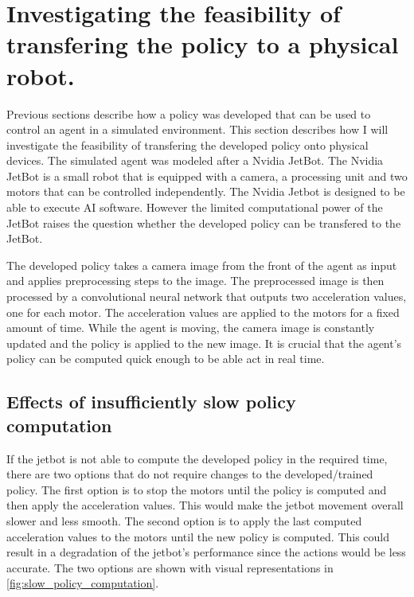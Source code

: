 
\section{Investigating the feasibility of transfering the policy to a physical robot.}

Previous sections describe how a policy was developed that can be used to control an agent in a simulated environment. This section describes how I will investigate the feasibility of transfering the developed policy onto physical devices. The simulated agent was modeled after a Nvidia JetBot. The Nvidia JetBot is a small robot that is equipped with a camera, a processing unit and two motors that can be controlled independently. 
The Nvidia Jetbot is designed to be able to execute AI software. However the limited computational power of the JetBot raises the question whether the developed policy can be transfered to the JetBot. 

The developed policy takes a camera image from the front of the agent as input and applies preprocessing steps to the image. The preprocessed image is then processed by a convolutional neural network that outputs two acceleration values, one for each motor. The acceleration values are applied to the motors for a fixed amount of time. While the agent is moving, the camera image is constantly updated and the policy is applied to the new image. It is crucial that the agent's policy can be computed quick enough to be able act in real time. 

\subsection*{Effects of insufficiently slow policy computation}
If the jetbot is not able to compute the developed policy in the required time, there are two options that do not require changes to the developed/trained policy. The first option is to stop the motors until the policy is computed and then apply the acceleration values. This would make the jetbot movement overall slower and less smooth.
The second option is to apply the last computed acceleration values to the motors until the new policy is computed. This could result in a degradation of the jetbot's performance since the actions would be less accurate.
The two options are shown with visual representations in \ref{fig:slow_policy_computation}.


